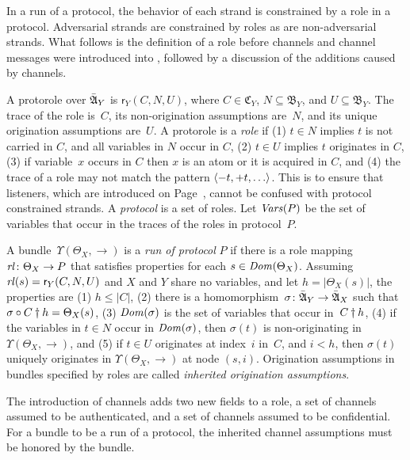 \documentclass[12pt]{report}
\theoremstyle{definition}
\newcommand{\algbara}{\bar{\alg{A}}}
\newcommand{\tr}{\ensuremath{\mathfrak C}}
\newcommand{\base}{\ensuremath{\mathfrak B}}
\newcommand{\sdom}{\fn{Dom}}
\newcommand{\svars}{\fn{Vars}}
\newcommand{\role}{\mathsf{r}}
\newcommand{\rl}{\fn{rl}}
\begin{document}
In a run of a protocol, the behavior of each strand is constrained by
a role in a protocol.  Adversarial strands are constrained by roles as
are non-adversarial strands.  What follows is the definition of a role
before channels and channel messages were introduced into {\cpsa},
followed by a discussion of the additions caused by channels.

A protorole over $\algbara_Y$ is
$\role_Y(C,N,U)$, where $C\in\tr_Y$, $N\subseteq\base_Y$, and
$U\subseteq\base_Y$.  The trace of the role is~$C$, its
non-origination assumptions are~$N$, and its unique origination
assumptions are~$U$.  A protorole is a \emph{role} if (1)
$t\in N$ implies $t$ is not carried in $C$, and all variables in $N$
occur in $C$, (2) $t\in U$ implies $t$ originates in $C$, (3) if
variable~$x$ occurs in $C$ then $x$ is an atom or it is acquired in
$C$, and (4) the trace of a role may not match the pattern
$\langle\mathord - t, \mathord + t,\ldots\rangle$.  This is to ensure
that listeners, which are introduced on Page~\pageref{def:listeners},
cannot be confused with protocol constrained strands.
A \emph{protocol} is a set of roles.  Let
\index{Vars@\svars}$\svars(P)$ be the set of variables that occur in
the traces of the roles in protocol~$P$.

A bundle~$\Upsilon(\Theta_X,\to)$ is a \emph{run of protocol} $P$ if there is a role mapping
$\rl\colon\Theta_X\to P$ that satisfies properties for each
$s\in\sdom(\Theta_X)$.  Assuming $\rl(s)=\role_Y(C,N,U)$ and $X$ and
$Y$ share no variables, and let $h=|\Theta_X(s)|$, the properties are
(1) $h\leq|C|$, (2) there is a
homomorphism~$\sigma\colon\algbara_Y\to\algbara_X$ such that
${\mathord{\sigma}}\circ{\mathord{C\dagger h}}=\Theta_X(s)$, (3) $\sdom(\sigma)$ is the
set of variables that occur in~$C\dagger h$, (4) if the variables
in $t\in N$ occur in $\sdom(\sigma)$, then $\sigma(t)$ is
non-originating in $\Upsilon(\Theta_X,\to)$, and (5) if $t\in U$
originates at index~$i$ in~$C$, and $i<h$, then $\sigma(t)$
uniquely originates in $\Upsilon(\Theta_X,\to)$ at node $(s,i)$.
Origination assumptions in bundles specified by roles are called
\emph{inherited origination
  assumptions}.

The introduction of channels adds two new fields to a role, a set of
channels assumed to be authenticated, and a set of channels assumed to
be confidential.  For a bundle to be a run of a protocol, the
inherited channel assumptions must be honored by the bundle.
\end{document}
